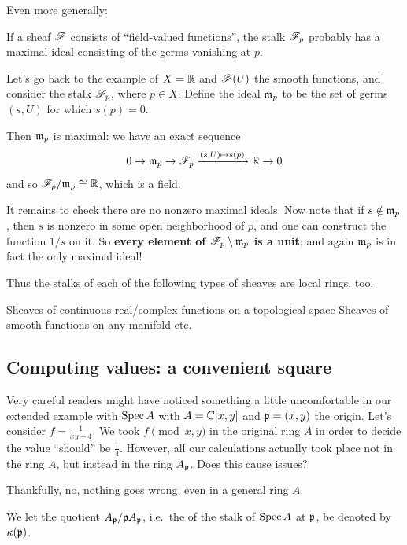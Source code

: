 Even more generally:
\begin{moral}
	If a sheaf $\mathscr F$ consists of ``field-valued functions'',
	the stalk $\mathscr F_p$ probably has a maximal ideal
	consisting of the germs vanishing at $p$.
\end{moral}

\begin{example}
Let's go back to the example of $X = \mathbb R$ and $\mathscr F(U)$ the smooth functions,
and consider the stalk $\mathscr F_{p}$, where $p \in X$.
Define the ideal $\mathfrak m_p$ to be the set of germs $(s,U)$ for which $s(p) = 0$.

Then $\mathfrak m_p$ is maximal: we have an exact sequence
\[ 0 \to \mathfrak m_p \to \mathscr F_p \xrightarrow{(s,U) \mapsto s(p)} \mathbb R \to 0 \]
and so $\mathscr F_p / \mathfrak m_p \cong \mathbb R$, which is a field.

It remains to check there are no nonzero maximal ideals.
Now note that if $s \notin \mathfrak m_p$,
then $s$ is nonzero in some open neighborhood of $p$,
and one can construct the function $1/s$ on it.
So \textbf{every element of $\mathscr F_p \setminus \mathfrak m_p$ is a unit};
and again $\mathfrak m_p$ is in fact the only maximal ideal!

Thus the stalks of each of the following types of sheaves
are local rings, too.
\begin{itemize}
	\ii Sheaves of continuous real/complex functions on a topological space
	\ii Sheaves of smooth functions on any manifold
	\ii etc.
\end{itemize}
\end{example}

\subsection{Computing values: a convenient square}
\label{sec:convenient_square}
Very careful readers might have noticed something
a little uncomfortable in our extended example with $\operatorname{Spec} A$
with $A = \mathbb C[x,y]$ and $\mathfrak p = (x,y)$ the origin.
Let's consider $f = \frac{1}{xy+4}$.
We took $f \pmod{x,y}$ in the original ring $A$ in order
to decide the value ``should'' be $\frac14$.
However, all our calculations actually
took place not in the ring $A$, but instead in the ring $A_\mathfrak p$.
Does this cause issues?

Thankfully, no, nothing goes wrong, even in a general ring $A$.

\begin{definition}
	We let the quotient $A_\mathfrak p / \mathfrak p A_\mathfrak p$,
	i.e.\ the  of the stalk of $\operatorname{Spec} A$ at $\mathfrak p$,
	be denoted by $\kappa(\mathfrak p)$.
\end{definition}

